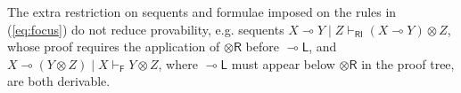 \documentclass[submission,copyright,creativecommons]{eptcs}
\theoremstyle{definition}
\newcommand{\tr}{\otimes \mathsf{R}}
\newcommand{\lright}{{\multimap}\mathsf{R}}
\newcommand{\lleft}{{\multimap}\mathsf{L}}
\newcommand{\pass}{\mathsf{pass}}
\newcommand{\ax}{\mathsf{ax}}
\newcommand{\ot}{\otimes}
\newcommand{\lolli}{\multimap}
\newcommand{\RI}{\mathsf{RI}}
\newcommand{\LI}{\mathsf{LI}}
\newcommand{\Pass}{\mathsf{P}}
\newcommand{\F}{\mathsf{F}}
\begin{document}
 The extra restriction on sequents and formulae imposed on the rules in (\ref{eq:focus}) do not reduce provability, e.g. sequents $X \lolli Y \mid Z \vdash_{\RI} (X \lolli Y) \ot Z$, whose proof requires the application of $\tr$ before $\lleft$, and $X \lolli (Y \ot Z) \mid X \vdash_\F Y \ot Z$, where $\lleft$ must appear below $\tr$ in the proof tree, are both derivable.
\end{document}
